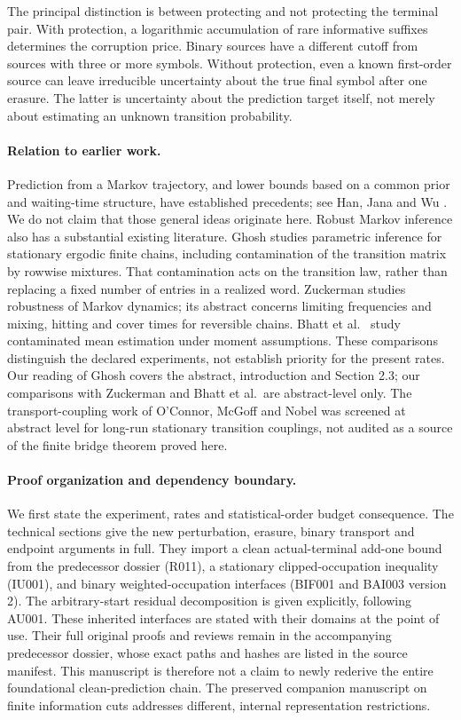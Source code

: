 \documentclass[11pt]{article}
\theoremstyle{remark}\newtheorem{remark}[theorem]{Remark}
\newcommand{\1}{\mathbf 1}
\begin{document}
The principal distinction is between protecting and not protecting the terminal pair. With protection, a logarithmic accumulation of rare informative suffixes determines the corruption price. Binary sources have a different cutoff from sources with three or more symbols. Without protection, even a known first-order source can leave irreducible uncertainty about the true final symbol after one erasure. The latter is uncertainty about the prediction target itself, not merely about estimating an unknown transition probability.

\paragraph{Relation to earlier work.}
Prediction from a Markov trajectory, and lower bounds based on a common prior and waiting-time structure, have established precedents; see Han, Jana and Wu \citep{han2022}. We do not claim that those general ideas originate here. Robust Markov inference also has a substantial existing literature. Ghosh \citep{ghosh2021} studies parametric inference for stationary ergodic finite chains, including contamination of the transition matrix by rowwise mixtures. That contamination acts on the transition law, rather than replacing a fixed number of entries in a realized word. Zuckerman \citep{zuckerman2026} studies robustness of Markov dynamics; its abstract concerns limiting frequencies and mixing, hitting and cover times for reversible chains. Bhatt et al.\ \citep{bhatt2022} study contaminated mean estimation under moment assumptions. These comparisons distinguish the declared experiments, not establish priority for the present rates. Our reading of Ghosh covers the abstract, introduction and Section 2.3; our comparisons with Zuckerman and Bhatt et al.\ are abstract-level only. The transport-coupling work of O'Connor, McGoff and Nobel \citep{oconnor2022} was screened at abstract level for long-run stationary transition couplings, not audited as a source of the finite bridge theorem proved here.

\paragraph{Proof organization and dependency boundary.}
We first state the experiment, rates and statistical-order budget consequence. The technical sections give the new perturbation, erasure, binary transport and endpoint arguments in full. They import a clean actual-terminal add-one bound from the predecessor dossier (R011), a stationary clipped-occupation inequality (IU001), and binary weighted-occupation interfaces (BIF001 and BAI003 version 2). The arbitrary-start residual decomposition is given explicitly, following AU001. These inherited interfaces are stated with their domains at the point of use. Their full original proofs and reviews remain in the accompanying predecessor dossier, whose exact paths and hashes are listed in the source manifest. This manuscript is therefore not a claim to newly rederive the entire foundational clean-prediction chain. The preserved companion manuscript on finite information cuts addresses different, internal representation restrictions.
\end{document}
